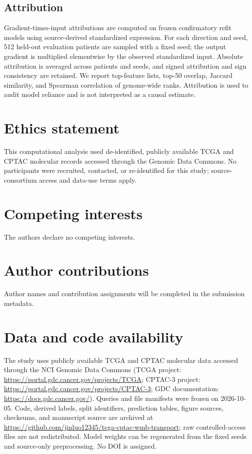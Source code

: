\documentclass[11pt]{article}
\begin{document}
\subsection{Attribution}
Gradient-times-input attributions are computed on frozen confirmatory refit models using source-derived standardized expression. For each direction and seed, 512 held-out evaluation patients are sampled with a fixed seed; the output gradient is multiplied elementwise by the observed standardized input. Absolute attribution is averaged across patients and seeds, and signed attribution and sign consistency are retained. We report top-feature lists, top-50 overlap, Jaccard similarity, and Spearman correlation of genome-wide ranks. Attribution is used to audit model reliance and is not interpreted as a causal estimate.

\section*{Ethics statement}
This computational analysis used de-identified, publicly available TCGA and CPTAC molecular records accessed through the Genomic Data Commons. No participants were recruited, contacted, or re-identified for this study; source-consortium access and data-use terms apply.

\section*{Competing interests}
The authors declare no competing interests.

\section*{Author contributions}
Author names and contribution assignments will be completed in the submission metadata.

\section{Data and code availability}
The study uses publicly available TCGA and CPTAC molecular data accessed through the NCI Genomic Data Commons (TCGA project: \url{https://portal.gdc.cancer.gov/projects/TCGA}; CPTAC-3 project: \url{https://portal.gdc.cancer.gov/projects/CPTAC-3}; GDC documentation: \url{https://docs.gdc.cancer.gov/}). Queries and file manifests were frozen on 2026-10-05. Code, derived labels, split identifiers, prediction tables, figure sources, checksums, and manuscript source are archived at \url{https://github.com/jinluo12345/tcga-cptac-wmb-transport}; raw controlled-access files are not redistributed. Model weights can be regenerated from the fixed seeds and source-only preprocessing. No DOI is assigned.
\end{document}
